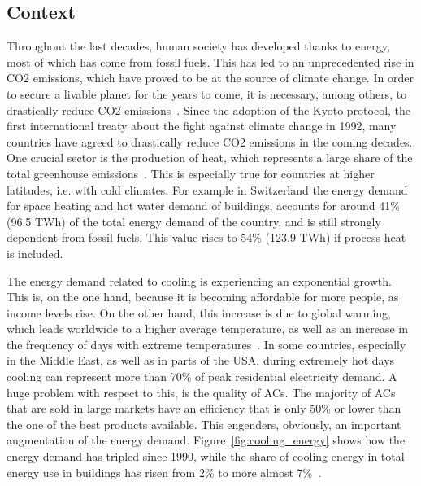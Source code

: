 \documentclass{article}
\begin{document}
\subsection{Context}
Throughout the last decades, human society has developed thanks to energy, most of which has come from fossil fuels. This has led to an unprecedented rise in CO2 emissions, which have proved to be at the source of climate change. In order to secure a livable planet for the years to come, it is necessary, among others, to drastically reduce CO2 emissions~\cite{ipccSummaryPolicymakersIPCC2018}. Since the adoption of the Kyoto protocol, the first international treaty about the fight against climate change in 1992, many countries have agreed to drastically reduce CO2 emissions in the coming decades.\\

One crucial sector is the production of heat, which represents a large share of the total greenhouse emissions~\cite{bacherEnergieRespektSchlusselFur2014}. This is especially true for countries at higher latitudes, i.e. with cold climates. For example in Switzerland the energy demand for space heating and hot water demand of buildings, accounts for around 41\% (96.5 TWh) of the total energy demand of the country, and is still strongly dependent from fossil fuels. This value rises to 54\% (123.9 TWh) if process heat is included. 

The energy demand related to cooling is experiencing an exponential growth. This is, on the one hand, because it is becoming affordable for more people, as income levels rise. On the other hand, this increase is due to global warming, which leads worldwide to a higher average temperature, as well as an increase in the frequency of days with extreme temperatures~\cite{ipccSummaryPolicymakersIPCC2018}. In some countries, especially in the Middle East, as well as in parts of the USA, during extremely hot days cooling can represent more than 70\% of peak residential electricity demand. A huge problem with respect to this, is the quality of ACs. The majority of ACs that are sold in large markets have an efficiency that is only 50\% or lower than the one of the best products available. This engenders, obviously, an important augmentation of the energy demand. Figure~\ref{fig:cooling_energy} shows how the energy demand has tripled since 1990, while the share of cooling energy in total energy use in buildings has risen from 2\% to more almost 7\%~\cite{birolFutureCooling2018}. 
\end{document}
